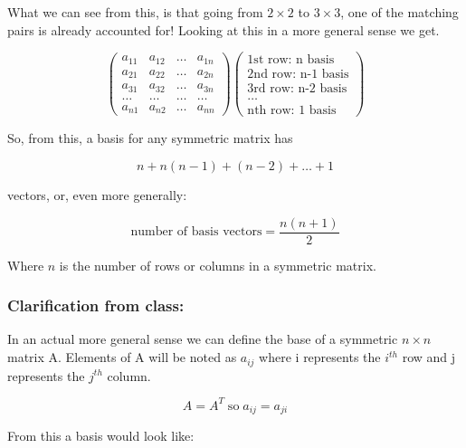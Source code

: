 What we can see from this, is that going from $2 \times 2$ to $3 \times 3$, one of the matching pairs is already accounted for! Looking at this in a more general sense we get.

\[
	\begin{pmatrix}
		a_{11} & a_{12} & \dots & a_{1n} \\
		a_{21} & a_{22} & \dots & a_{2n} \\
		a_{31} & a_{32} & \dots & a_{3n} \\
		\dots & \dots & \dots & \dots \\
		a_{n1} & a_{n2} & \dots & a_{nn}
	\end{pmatrix} 
	\begin{pmatrix}
		\text{1st row: n basis} \\
		\text{2nd row: n-1 basis} \\
		\text{3rd row: n-2 basis} \\
		\dots \\
		\text{nth row: 1 basis}
	\end{pmatrix}
\]

So, from this, a basis for any symmetric matrix has 

\[n + n(n-1) + (n - 2) + \dots + 1\]

vectors, or, even more generally:

\[\text{number of basis vectors} = \frac{n(n+1)}{2}\]

Where $n$ is the number of rows or columns in a symmetric matrix.

\subsubsection*{Clarification from class:}

In an actual more general sense we can define the base of a symmetric $n \times n$ matrix A. Elements of A will be noted as $a_{ij}$ where i represents the $i^{th}$ row and j represents the $j^{th}$ column. 

\[
	A = A^T \; \text{so} \; a_{ij} = a_{ji}
\]

From this a basis would look like:

